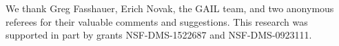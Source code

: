 \documentclass[review]{elsarticle}
\theoremstyle{definition}
\newenvironment{FJHchange}{}{} %
\begin{document}
\begin{FJHchange}
	We thank Greg Fasshauer, Erich Novak, the GAIL team, and two anonymous referees 
	for their valuable comments and suggestions. This research was supported in part by 
	grants NSF-DMS-1522687 and NSF-DMS-0923111.
\end{FJHchange}





\end{document}
